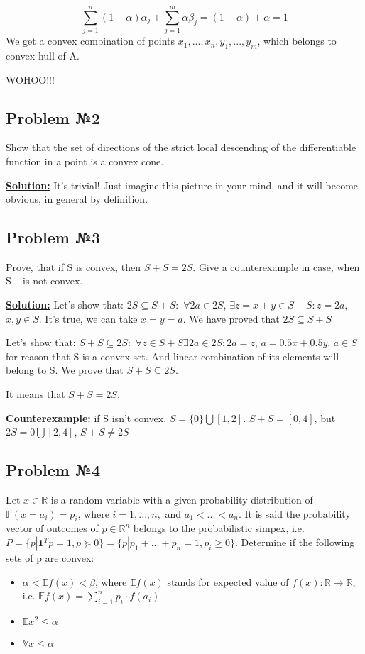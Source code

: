\begin{equation*}
    \sum\limits_{j=1}^n(1-\alpha)\alpha_j + \sum\limits_{j=1}^m\alpha \beta_j = (1-\alpha) + \alpha = 1
\end{equation*}
We get a convex combination of points $x_1, ..., x_n, y_1, ..., y_m$, which belongs to convex hull of A. 

WOHOO!!!


\subsection{Problem №2}
Show that the set of directions of the strict local descending of the differentiable function in a point is a convex cone.

\underline{\textbf{Solution:}}
It's trivial! Just imagine this picture in your mind, and it will become obvious, in general by definition.

\subsection{Problem №3}
Prove, that if S is convex, then $S + S = 2S$. Give a counterexample in case, when S -- is not convex.

\underline{\textbf{Solution:}} 
Let's show that: $2S \subseteq S + S:$ $\forall 2a \in 2S$, $\exists z= x + y \in S +S : z = 2a,$ $x, y \in S$. It's true, we can take $x = y = a$. We have proved that $2S \subseteq S +S$

Let's show that: $S + S \subseteq 2S:$ $\forall z \in S + S \exists 2a \in 2S : 2a = z$, $a = 0.5 x + 0.5 y$, $a \in S$ for reason that S is a convex set. And linear combination of its elements will belong to S. We prove that $S + S \subseteq 2S$.

It means that $S + S = 2S$.

\underline{\textbf{Counterexample:}} if S isn't convex. $S = \{0\} \bigcup [1, 2]$. 
\newline
$S + S = [0, 4]$, but $2S = {0} \bigcup [2, 4]$, $S + S \not = 2S$

\subsection{Problem №4}
Let $x \in \mathds{R}$ is a random variable with a given probability distribution of $\mathds{P}(x = a_i) = p_i$, where $i = 1, ..., n,$ and $a_1 < ... < a_n$. It is said the probability vector of outcomes of $p \in \mathds{R}^n$ belongs to the probabilistic simpex, i.e. $P = \{ p | \textbf{1}^Tp = 1, p \succcurlyeq 0\} = \{ p | p_1 + ... + p_n = 1, p_i \geq 0 \}$.
\newline
Determine if the following sets of p are convex:
\begin{itemize}
    \item $\alpha < \mathds{E} f(x) < \beta$, where $\mathds{E}f(x)$ stands for expected value of $f(x) : \mathds{R} \xrightarrow{} \mathds{R}$, i.e. $\mathds{E}f(x) = \sum\limits_{i=1}^n p_i\cdot f(a_i)$

    \item $\mathds{E}x^2 \leq \alpha$
    \item $\mathds{V}x \leq \alpha$
\end{itemize}

